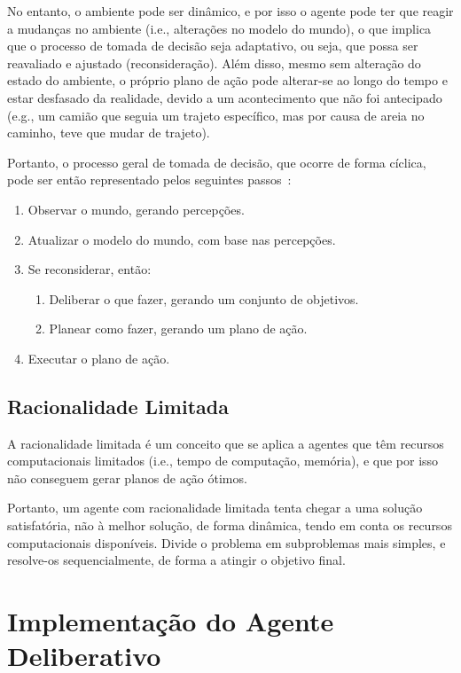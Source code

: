 No entanto, o ambiente pode ser dinâmico, e por isso o agente pode ter que reagir a mudanças no ambiente (i.e., alterações no modelo do mundo), o que implica que o processo de tomada de decisão seja adaptativo, ou seja, que possa ser reavaliado e ajustado (reconsideração).
Além disso, mesmo sem alteração do estado do ambiente, o próprio plano de ação pode alterar-se ao longo do tempo e estar desfasado da realidade, devido a um acontecimento que não foi antecipado (e.g., um camião que seguia um trajeto específico, mas por causa de areia no caminho, teve que mudar de trajeto).

Portanto, o processo geral de tomada de decisão, que ocorre de forma cíclica, pode ser então representado pelos seguintes passos~\cite{isel:iasa:slides:arq-agentes-deliberativos}:

\begin{enumerate}
    \item Observar o mundo, gerando percepções.
    \item Atualizar o modelo do mundo, com base nas percepções.
    \item Se reconsiderar, então:
    \begin{enumerate}
        \item Deliberar o que fazer, gerando um conjunto de objetivos.
        \item Planear como fazer, gerando um plano de ação.
    \end{enumerate}
    \item Executar o plano de ação.
\end{enumerate}

\subsection{Racionalidade Limitada}\label{subsec:racionalidade-limitada}

A racionalidade limitada é um conceito que se aplica a agentes que têm recursos computacionais limitados (i.e., tempo de computação, memória), e que por isso não conseguem gerar planos de ação ótimos.

Portanto, um agente com racionalidade limitada tenta chegar a uma solução satisfatória, não à melhor solução, de forma dinâmica, tendo em conta os recursos computacionais disponíveis.
Divide o problema em subproblemas mais simples, e resolve-os sequencialmente, de forma a atingir o objetivo final.


\section{Implementação do Agente Deliberativo}\label{sec:implementacao-agente-deliberativo}
